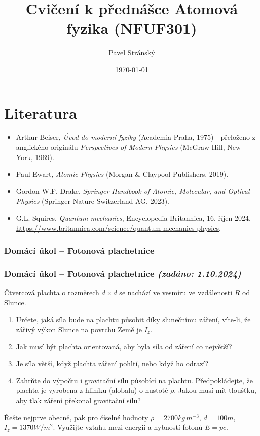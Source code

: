 \documentclass[a4paper,11pt,twoside]{article}
\newenvironment{homework}{}{}
\newcommand{\np}{\clearpage\newpage}
\newcommand{\exercise}[2][]{\ifthenelse{\isempty{#1}}
	{\np\thispagestyle{empty}\subsubsection*{Domácí úkol -- #2}}
	{\np\thispagestyle{empty}\np\subsubsection*{Domácí úkol -- #2 \small{\it{(zadáno: {#1})}}}}
}
\begin{document}
\makeatletter
{}
\renewcommand{\theequation}{\arabic{section}.\arabic{subsection}.\arabic{equation}}
\makeatother

\title{Cvičení k přednášce Atomová fyzika (NFUF301)}
\date{\today}
\author{Pavel Stránský}

\maketitle
{}
\tableofcontents\np

\section*{Literatura}
\begin{itemize}
	\item Arthur Beiser, {\it Úvod do moderní fyziky} (Academia Praha, 1975) - přeloženo z anglického originálu {\it Perspectives of Modern Physics} (McGraw-Hill, New York, 1969).
	
	\item Paul Ewart, {\it Atomic Physics} (Morgan \& Claypool Publishers, 2019).
	
	\item Gordon W.F. Drake, {\it Springer Handbook of Atomic, Molecular, and Optical Physics} (Springer Nature Switzerland AG, 2023).

	\item G.L. Squires, {\it Quantum mechanics}, Encyclopedia Britannica, 16. říjen 2024, \url{https://www.britannica.com/science/quantum-mechanics-physics}.
\end{itemize}

\np
\np
\np
\np
\np
\np
\np
\np
\np
\np

\begin{homework}
\exercise[1.10.2024]{Fotonová plachetnice}
    Čtvercová plachta o rozměrech $d\times d$ se nachází ve vesmíru ve vzdálenosti $R$ od Slunce.
	\begin{enumerate}
		\item Určete, jaká síla bude na plachtu působit díky slunečnímu záření, víte-li, že zářivý výkon Slunce na povrchu Země je $I_{z}$.
		\item Jak musí být plachta orientovaná, aby byla síla od záření co největší?
		\item Je síla větší, když plachta záření pohltí, nebo když ho odrazí?
		\item Zahrňte do výpočtu i gravitační sílu působící na plachtu. 
			Předpokládejte, že plachta je vyrobena z hliníku (alobalu) o hustotě $\rho$.
			Jakou musí mít tloušťku, aby tlak záření překonal gravitační sílu?
	\end{enumerate}
	Řešte nejprve obecně, pak pro číselné hodnoty $\rho=2700\unit{kg\,m^{-3}}$, $d=100\unit{m}$, $I_z=1370\unit{W/m^{2}}$.
	Využijte vztahu mezi energií a hybností fotonů $E=pc$.    
\end{homework}
\end{document}
